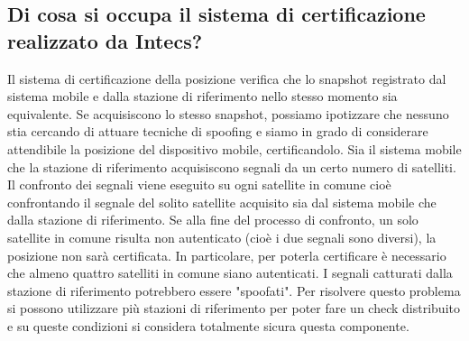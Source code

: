 \subsection{Di cosa si occupa il sistema di certificazione realizzato da Intecs?}
Il sistema di certificazione della posizione verifica che lo snapshot registrato dal sistema mobile e dalla stazione di riferimento nello stesso momento sia equivalente. Se acquisiscono lo stesso snapshot, possiamo ipotizzare che nessuno stia cercando di attuare tecniche di spoofing e siamo in grado di considerare attendibile la posizione del dispositivo mobile, certificandolo. Sia il sistema mobile che la stazione di riferimento acquisiscono segnali da un certo numero di satelliti. Il confronto dei segnali viene eseguito su ogni satellite in comune cioè confrontando il segnale del solito satellite acquisito sia dal sistema mobile che dalla stazione di riferimento. Se alla fine del processo di confronto, un solo satellite in comune risulta non autenticato (cioè i due segnali sono diversi), la posizione non sarà certificata. In particolare, per poterla certificare è necessario che almeno quattro satelliti in comune siano autenticati. I segnali catturati dalla stazione di riferimento potrebbero essere "spoofati". Per risolvere questo problema si possono utilizzare più stazioni di riferimento per poter fare un check distribuito e su queste condizioni si considera totalmente sicura questa componente.

